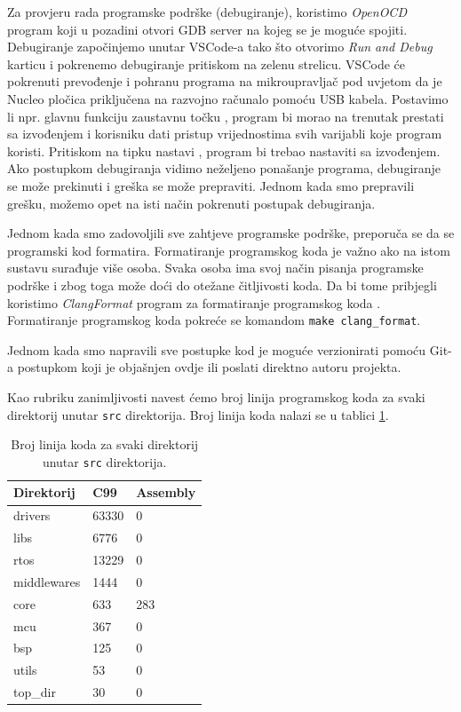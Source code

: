 \documentclass[times, utf8, diplomski, numeric]{templates/template}
\begin{document}
{{        Za provjeru rada programske podrške (debugiranje), koristimo \emph{OpenOCD} \cite{openocd} program koji u pozadini otvori GDB \cite{gdb} server na kojeg se je moguće spojiti. Debugiranje započinjemo unutar VSCode-a tako što otvorimo \emph{Run and Debug} karticu i pokrenemo debugiranje pritiskom na zelenu strelicu. VSCode će pokrenuti prevođenje i pohranu programa na mikroupravljač pod uvjetom da je Nucleo pločica priključena na razvojno računalo pomoću USB kabela. Postavimo li npr. glavnu funkciju zaustavnu točku , program bi morao na trenutak prestati sa izvođenjem i korisniku dati pristup vrijednostima svih varijabli koje program koristi. Pritiskom na tipku nastavi , program bi trebao nastaviti sa izvođenjem. Ako postupkom debugiranja vidimo neželjeno ponašanje programa, debugiranje se može prekinuti i greška se može prepraviti. Jednom kada smo prepravili grešku, možemo opet na isti način pokrenuti postupak debugiranja.

        Jednom kada smo zadovoljili sve zahtjeve programske podrške, preporuča se da se programski kod formatira. Formatiranje programskog koda je važno ako na istom sustavu surađuje više osoba. Svaka osoba ima svoj način pisanja programske podrške i zbog toga može doći do otežane čitljivosti koda. Da bi tome pribjegli koristimo \emph{ClangFormat} program za formatiranje programskog koda \cite{clang_format}. Formatiranje programskog koda pokreće se komandom \texttt{make clang\_format}.

        Jednom kada smo napravili sve postupke kod je moguće verzionirati pomoću Git-a postupkom koji je objašnjen ovdje \cite{git_commit_instrukcije} ili poslati direktno autoru projekta.

        Kao rubriku zanimljivosti navest ćemo broj linija programskog koda za svaki direktorij unutar \texttt{src} direktorija. Broj linija koda nalazi se u tablici \ref{tbl:broj_linija}.

        \begin{table}[htb]
        \caption{Broj linija koda za svaki direktorij unutar \texttt{src} direktorija.}
        \label{tbl:broj_linija}
        \centering
        \begin{tabular}{lll} 
        \toprule
        Direktorij & C99 & Assembly \\ 
        \midrule
        drivers     &     63330    &   0    \\
        libs        &     6776     &   0    \\
        rtos        &     13229    &   0    \\
        middlewares &     1444     &   0    \\
        core        &     633      &   283  \\
        mcu         &     367      &   0    \\
        bsp         &     125      &   0    \\
        utils       &     53       &   0    \\
        top\_dir    &     30       &   0    \\
        \bottomrule
        \end{tabular}
        \end{table}
    }
}
\end{document}
